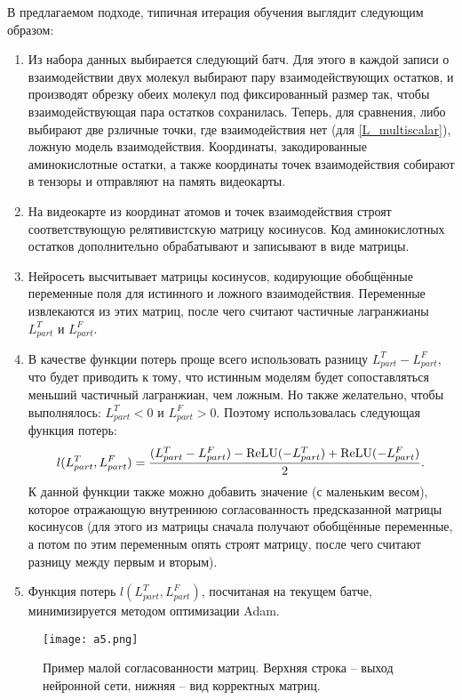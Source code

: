 В предлагаемом подходе, типичная итерация обучения выглядит следующим образом: 
\begin{enumerate}
\item Из набора данных выбирается следующий батч. Для этого в каждой записи о взаимодействии двух молекул выбирают пару взаимодействующих остатков, и производят обрезку обеих молекул под фиксированный размер так, чтобы взаимодействующая пара остатков сохранилась. Теперь, для сравнения, либо выбирают две рзличные точки, где взаимодействия нет (для \ref{L_multiscalar}), ложную модель взаимодействия. Координаты, закодированные аминокислотные остатки, а также координаты точек взаимодействия собирают в тензоры и отправляют на память видеокарты.
\item На видеокарте из координат атомов и точек взаимодействия строят соответствующую релятивистскую матрицу косинусов. Код аминокислотных остатков дополнительно обрабатывают и записывают в виде матрицы.
\item Нейросеть высчитывает матрицы косинусов, кодирующие обобщённые переменные поля для истинного и ложного взаимодействия. Переменные извлекаются из этих матриц, после чего считают частичные лагранжианы $L^{T}_{part}$ и $L^{F}_{part}$. 
\item В качестве функции потерь проще всего использовать разницу $L^{T}_{part} - L^{F}_{part}$, что будет приводить к тому, что истинным моделям будет сопоставляться меньший частичный лагранжиан, чем ложным. Но также желательно, чтобы выполнялось: $L^T_{part} < 0$ и $L^{F}_{part} > 0$. Поэтому использовалась следующая функция потерь:
\begin{equation}
	l(L^{T}_{part}, L^{F}_{part}) = \frac{(L^{T}_{part} - L^{F}_{part}) - \operatorname{ReLU}(-L^{T}_{part}) + \operatorname{ReLU}(-L^{F}_{part})}{2}.
	\label{loss_function}
\end{equation}
К данной функции также можно добавить значение (с маленьким весом), которое отражающую внутреннюю согласованность предсказанной матрицы косинусов (для этого из матрицы сначала получают обобщённые переменные, а потом по этим переменным опять строят матрицу, после чего считают разницу между первым и вторым).
\item Функция потерь $l(L^{T}_{part}, L^{F}_{part})$, посчитаная на текущем батче, минимизируется методом оптимизации Adam.
\end{enumerate}
\begin{figure}[H]
	\centering
	\texttt{[image: a5.png]}
	\caption{Пример малой согласованности матриц. Верхняя строка -- выход нейронной сети, нижняя -- вид корректных матриц.}
	\label{fig_consistency}
\end{figure}

